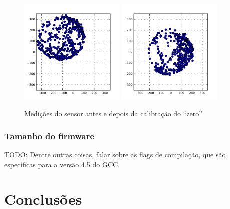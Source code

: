 \documentclass[brazil,pagestart=firstchapter]{abnt}
\begin{document}
\begin{figure}[h]
\centering
\includegraphics[width=0.45\textwidth]{img/zerocal_off.pdf}
\includegraphics[width=0.45\textwidth]{img/zerocal_on.pdf}
\caption{Medições do sensor antes e depois da calibração do ``zero''}
\label{fig:zerocal}
\end{figure}


%
%


\subsection{Tamanho do firmware}
\label{sub:firmware_size}

TODO: Dentre outras coisas, falar sobre as flags de compilação, que são
específicas para a versão 4.5 do GCC.


\chapter{Conclusões}
\label{cap:conclusoes}
\end{document}
